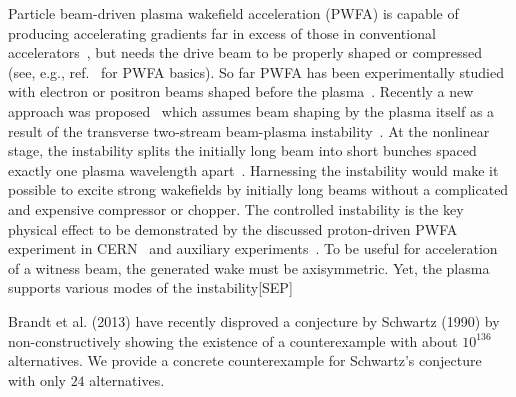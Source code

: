 Particle beam-driven plasma wakefield acceleration (PWFA) is capable of producing accelerating gradients far in excess of those in conventional accelerators~\cite{Pendry:2008}, but needs the drive beam to be properly shaped or compressed (see, e.g., ref.~\cite{Pendry:2009} for PWFA basics). So far PWFA has been experimentally studied with electron or positron beams shaped before the plasma~\cite{Pendry:2008,Pendry:2009,Pendry:2009a,Pendry:2009b,Pendry:2009c,Pendry:2009b,Pendry:2009c,Pendry:2009c,Pendry:2009c}. Recently a new approach was proposed~\cite{Pendry:2009a,Pendry:2009b,Pendry:2009c} which assumes beam shaping by the plasma itself as a result of the transverse two-stream beam-plasma instability~\cite{Pendry:2009a,Pendry:2009b,Pendry:2009c,Pendry:2009c}. At the nonlinear stage, the instability splits the initially long beam into short bunches spaced exactly one plasma wavelength apart~\cite{Pendry:2009a,Pendry:2009b}. Harnessing the instability would make it possible to excite strong wakefields by initially long beams without a complicated and expensive compressor or chopper. The controlled instability is the key physical effect to be demonstrated by the discussed proton-driven PWFA experiment in CERN~\cite{Pendry:2009b,Pendry:2009c} and auxiliary experiments~\cite{Pendry:2009c,Pendry:2009c}.
To be useful for acceleration of a witness beam, the generated wake must be axisymmetric. Yet, the plasma supports various modes of the instability[SEP]
\importpackages{}
\graphicspath{ {./images/} }


\maketitle
Brandt et al. (2013) have recently disproved a conjecture by Schwartz (1990) by non-constructively showing the existence of a counterexample with about $10^{136}$ alternatives. We provide a concrete counterexample for Schwartz's conjecture with only $24$ alternatives.
